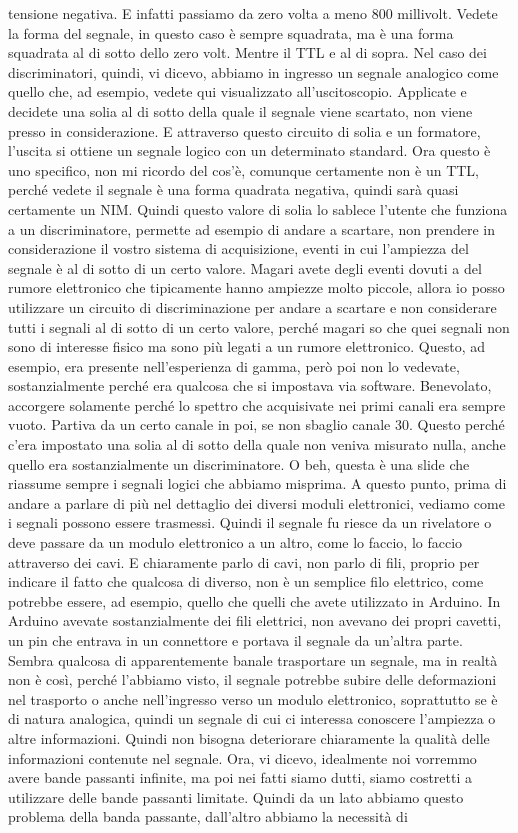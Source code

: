 tensione negativa. E infatti passiamo da zero volta a meno 800 millivolt. Vedete la forma del segnale, in questo caso è sempre squadrata, ma è una forma squadrata al di sotto dello zero volt. Mentre il TTL e al di sopra. Nel caso dei discriminatori, quindi, vi dicevo, abbiamo in ingresso un segnale analogico come quello che, ad esempio, vedete qui visualizzato all'uscitoscopio. Applicate e decidete una solia al di sotto della quale il segnale viene scartato, non viene presso in considerazione. E attraverso questo circuito di solia e un formatore, l'uscita si ottiene un segnale logico con un determinato standard. Ora questo è uno specifico, non mi ricordo del cos'è, comunque certamente non è un TTL, perché vedete il segnale è una forma quadrata negativa, quindi sarà quasi certamente un NIM. Quindi questo valore di solia lo sablece l'utente che funziona a un discriminatore, permette ad esempio di andare a scartare, non prendere in considerazione il vostro sistema di acquisizione, eventi in cui l'ampiezza del segnale è al di sotto di un certo valore. Magari avete degli eventi dovuti a del rumore elettronico che tipicamente hanno ampiezze molto piccole, allora io posso utilizzare un circuito di discriminazione per andare a scartare e non considerare tutti i segnali al di sotto di un certo valore, perché magari so che quei segnali non sono di interesse fisico ma sono più legati a un rumore elettronico. Questo, ad esempio, era presente nell'esperienza di gamma, però poi non lo vedevate, sostanzialmente perché era qualcosa che si impostava via software. Benevolato, accorgere solamente perché lo spettro che acquisivate nei primi canali era sempre vuoto. Partiva da un certo canale in poi, se non sbaglio canale 30. Questo perché c'era impostato una solia al di sotto della quale non veniva misurato nulla, anche quello era sostanzialmente un discriminatore. O beh, questa è una slide che riassume sempre i segnali logici che abbiamo misprima. A questo punto, prima di andare a parlare di più nel dettaglio dei diversi moduli elettronici, vediamo come i segnali possono essere trasmessi. Quindi il segnale fu riesce da un rivelatore o deve passare da un modulo elettronico a un altro, come lo faccio, lo faccio attraverso dei cavi. E chiaramente parlo di cavi, non parlo di fili, proprio per indicare il fatto che qualcosa di diverso, non è un semplice filo elettrico, come potrebbe essere, ad esempio, quello che quelli che avete utilizzato in Arduino. In Arduino avevate sostanzialmente dei fili elettrici, non avevano dei propri cavetti, un pin che entrava in un connettore e portava il segnale da un'altra parte. Sembra qualcosa di apparentemente banale trasportare un segnale, ma in realtà non è così, perché l'abbiamo visto, il segnale potrebbe subire delle deformazioni nel trasporto o anche nell'ingresso verso un modulo elettronico, soprattutto se è di natura analogica, quindi un segnale di cui ci interessa conoscere l'ampiezza o altre informazioni. Quindi non bisogna deteriorare chiaramente la qualità delle informazioni contenute nel segnale. Ora, vi dicevo, idealmente noi vorremmo avere bande passanti infinite, ma poi nei fatti siamo dutti, siamo costretti a utilizzare delle bande passanti limitate. Quindi da un lato abbiamo questo problema della banda passante, dall'altro abbiamo la necessità di 